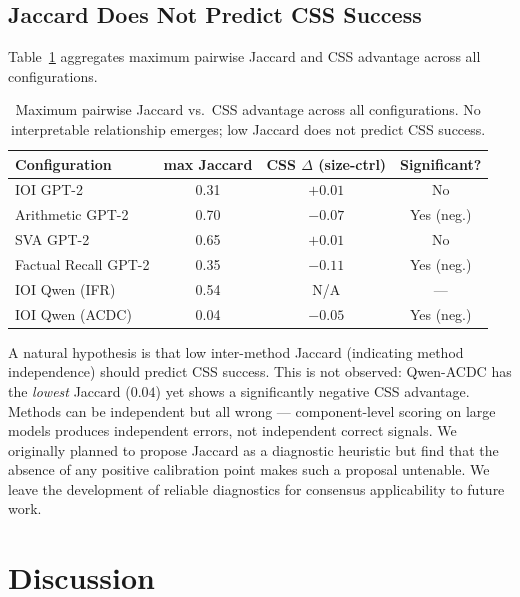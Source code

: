 \documentclass[11pt,a4paper]{article}
\begin{document}
\subsection{Jaccard Does Not Predict CSS Success}
\label{sec:jaccard}

Table~\ref{tab:jaccard_summary} aggregates maximum pairwise Jaccard and CSS advantage across all configurations.

\begin{table}[t]
\centering
\small
\caption{Maximum pairwise Jaccard vs.\ CSS advantage across all configurations. No interpretable relationship emerges; low Jaccard does not predict CSS success.}
\label{tab:jaccard_summary}
\begin{tabular}{lccc}
\toprule
\textbf{Configuration} & \textbf{max Jaccard} & \textbf{CSS $\Delta$ (size-ctrl)} & \textbf{Significant?} \\
\midrule
IOI GPT-2             & 0.31 & $+0.01$  & No \\
Arithmetic GPT-2      & 0.70 & $-0.07$  & Yes (neg.) \\
SVA GPT-2             & 0.65 & $+0.01$  & No \\
Factual Recall GPT-2  & 0.35 & $-0.11$  & Yes (neg.) \\
IOI Qwen (IFR)        & 0.54 & N/A      & --- \\
IOI Qwen (ACDC)       & 0.04 & $-0.05$  & Yes (neg.) \\
\bottomrule
\end{tabular}
\end{table}

A natural hypothesis is that low inter-method Jaccard (indicating method independence) should predict CSS success. This is not observed: Qwen-ACDC has the \emph{lowest} Jaccard ($0.04$) yet shows a significantly negative CSS advantage. Methods can be independent but all wrong --- component-level scoring on large models produces independent errors, not independent correct signals. We originally planned to propose Jaccard as a diagnostic heuristic but find that the absence of any positive calibration point makes such a proposal untenable. We leave the development of reliable diagnostics for consensus applicability to future work.

\section{Discussion}
\label{sec:discussion}
\end{document}
